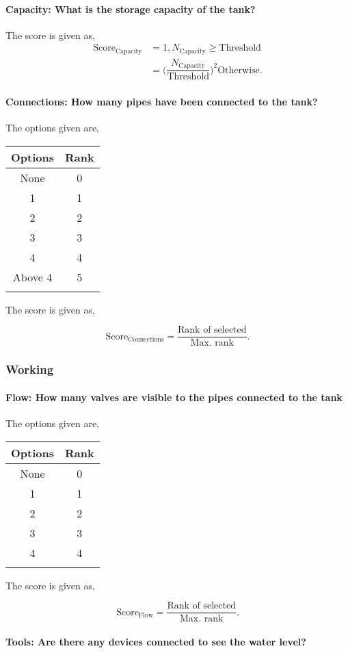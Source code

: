 \documentclass[oneside,twocolumn]{article}
\newcommand{\tsub}[2]{\text{#1}_{\text{#2}}}
\newcommand{\tsubb}[2]{#1_{\text{#2}}}
\newcommand{\dsub}[2]{\dfrac{\text{#1}}{\text{#2}}}
\newcommand{\singsel}[1]
{
	\[
		\tsub{Score}{#1} = \dsub{Rank of selected}{Max. rank}.
	\]
}
\newenvironment{ttable}
{
\begin{center}
\begin{tabular}{c|c}
\hline
}
{
\\ \hline
\end{tabular}
\end{center}
}
\begin{document}
\paragraph{Capacity: What is the storage capacity of the tank?}

The score is given as,
\begin{align*}
\tsub{Score}{Capacity} &= 1, \tsubb{N}{Capacity} \ge \text{Threshold} \\
        &=
\Big(\dfrac{\tsubb{N}{Capacity}}{\text{Threshold}}\Big)^{2}
\text{Otherwise}.
\end{align*}
\paragraph{Connections: 
How many pipes have been connected to the tank? 
}

The options given are,
\begin{ttable}
Options & Rank \\ \hline
None & 0 \\
1 & 1 \\
2 & 2 \\
3 & 3 \\
4 & 4 \\
Above 4 & 5 \\
\hline
\end{ttable}
The score is given as,
\singsel{Connections}
\subsubsection{Working}

\paragraph{Flow: 
How many valves are visible to the pipes connected to the tank 
}

The options given are,
\begin{ttable}
Options & Rank \\ \hline
None & 0 \\
1 & 1 \\
2 & 2 \\
3 & 3 \\
4 & 4 \\
\hline
\end{ttable}
The score is given as,
\singsel{Flow}
\paragraph{Tools: 
Are there any devices connected to see the water level? 
}
\end{document}
